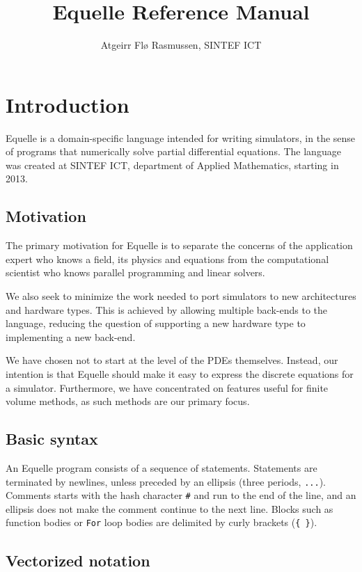 \documentclass[11pt]{article}
\title{Equelle Reference Manual}
\author{Atgeirr Fl{\o} Rasmussen, SINTEF ICT}
\newcommand{\code}[1]{\texttt{#1}}
\begin{document}
\maketitle


\section{Introduction}

Equelle is a domain-specific language intended for writing simulators, in the sense of
programs that numerically solve partial differential equations. The language was created
at SINTEF ICT, department of Applied Mathematics, starting in 2013.

\subsection{Motivation}

The primary motivation for Equelle is to separate the concerns of the application expert
who knows a field, its physics and equations from the computational scientist who knows
parallel programming and linear solvers.

We also seek to minimize the work needed to port simulators to new architectures and
hardware types. This is achieved by allowing multiple back-ends to the language, reducing
the question of supporting a new hardware type to implementing a new back-end.

We have chosen not to start at the level of the PDEs themselves. Instead, our intention is
that Equelle should make it easy to express the discrete equations for a simulator.
Furthermore, we have concentrated on features useful for finite volume methods, as such
methods are our primary focus.

\subsection{Basic syntax}

An Equelle program consists of a sequence of statements. Statements are terminated by
newlines, unless preceded by an ellipsis (three periods, \code{...}). Comments starts with
the hash character \code{\#} and run to the end of the line, and an ellipsis does not make
the comment continue to the next line. Blocks such as function bodies or \code{For} loop
bodies are delimited by curly brackets (\code{\{ \}}).

\subsection{Vectorized notation}
\end{document}
